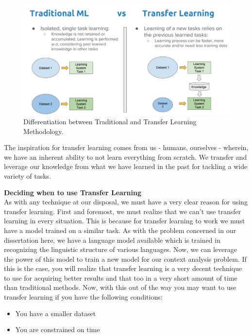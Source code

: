 \documentclass[a4paper, 12pt]{article}
\begin{document}
\begin{sloppypar}
\begin{figure}[H]
\begin{center}
\includegraphics[scale=0.45]{tl.png}
\caption{Differentiation between Traditional and Transfer Learning Methodology.\cite{noauthor_guide_2019} \label{tl}}
\end{center}
\end{figure}

The inspiration for transfer learning comes from us - humans, ourselves - wherein, we have an inherent ability to not learn everything from scratch. We transfer and leverage our knowledge from what we have learned in the past for tackling a wide variety of tasks.\cite{sarkar_deep_2018}

\large \textbf{Deciding when to use Transfer Learning} \\ [0.5ex]
\normalsize
As with any technique at our disposal, we must have a very clear reason for using transfer learning. First and foremost, we must realize that we can't use transfer learning in every situation. This is because for transfer learning to work we must have a model trained on a similar task. As with the problem concerned in our dissertation here, we have  a language model available which is trained in recognizing the linguistic structure of  various languages. Now, we can leverage the power of this model to train a new model for our
\thispagestyle{empty}
\clearpage
 context analysis problem. If this is the case, you will realize that transfer learning is a very decent technique to use for acquiring better results and that too in a very short amount of time than traditional methods. Now, with this out of the way you may want to use transfer learning if you have the following conditions:
\begin{itemize}
\item{You have a smaller dataset}
\item{You are constrained on time}
\end{itemize}


\end{sloppypar}
\end{document}
